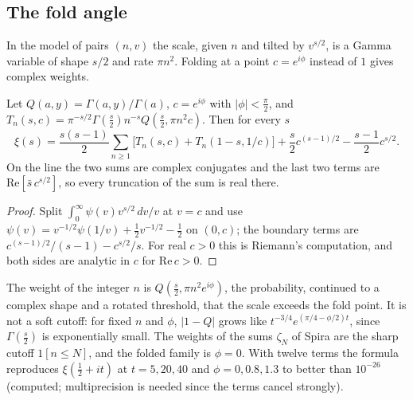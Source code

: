 \subsection{The fold angle}\label{lxi:sub:angle}

In the model of pairs $(n,v)$ the scale, given $n$ and tilted by $v^{s/2}$, is a Gamma variable of shape $s/2$ and rate $\pi n^2$. Folding at a point $c=e^{i\phi}$ instead of $1$ gives complex weights.

\begin{proposition}\label{lxi:prop:weights}
Let $Q(a,y)=\Gamma(a,y)/\Gamma(a)$, $c=e^{i\phi}$ with $|\phi|<\frac\pi2$, and $T_n(s,c)=\pi^{-s/2}\Gamma(\frac s2)n^{-s}Q(\frac s2,\pi n^2c)$. Then for every $s$
\[
\xi(s)=\frac{s(s-1)}2\sum_{n\ge1}\bigl[T_n(s,c)+T_n(1-s,1/c)\bigr]+\frac s2c^{(s-1)/2}-\frac{s-1}2c^{s/2}.
\]
On the line the two sums are complex conjugates and the last two terms are $\mathrm{Re}[\bar s\,c^{s/2}]$, so every truncation of the sum is real there.
\end{proposition}

\begin{proof}
Split $\int_0^\infty\psi(v)v^{s/2}\,dv/v$ at $v=c$ and use $\psi(v)=v^{-1/2}\psi(1/v)+\frac12v^{-1/2}-\frac12$ on $(0,c)$; the boundary terms are $c^{(s-1)/2}/(s-1)-c^{s/2}/s$. For real $c>0$ this is Riemann's computation, and both sides are analytic in $c$ for $\mathrm{Re}\,c>0$.
\end{proof}

The weight of the integer $n$ is $Q(\frac s2,\pi n^2e^{i\phi})$, the probability, continued to a complex shape and a rotated threshold, that the scale exceeds the fold point. It is not a soft cutoff: for fixed $n$ and $\phi$, $|1-Q|$ grows like $t^{-3/4}e^{(\pi/4-\phi/2)t}$, since $\Gamma(\frac s2)$ is exponentially small. The weights of the sums $\zeta_N$ of Spira are the sharp cutoff $1[n\le N]$, and the folded family is $\phi=0$. With twelve terms the formula reproduces $\xi(\frac12+it)$ at $t=5,20,40$ and $\phi=0,0.8,1.3$ to better than $10^{-26}$ (computed; multiprecision is needed since the terms cancel strongly).

